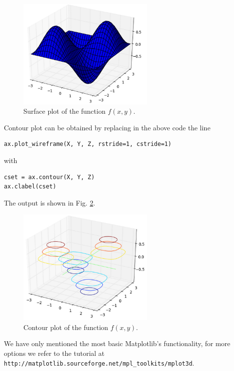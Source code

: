 \documentclass{article}
\begin{document}
\begin{figure}[!ht]
\begin{center}
\includegraphics[width=0.6\textwidth]{img/plot3d-3.png}
\end{center}
\vspace{-4mm}
\caption{Surface plot of the function $f(x, y)$.}
\label{fig:plot3d-3}
\end{figure}
\newpage

\noindent
Contour plot can be obtained by replacing in the above code 
the line 

\begin{verbatim}
ax.plot_wireframe(X, Y, Z, rstride=1, cstride=1)
\end{verbatim}
with 

\begin{verbatim}
cset = ax.contour(X, Y, Z)
ax.clabel(cset)
\end{verbatim}
The output is shown in Fig. \ref{fig:plot3d-4}.
\newpage

\begin{figure}[!ht]
\begin{center}
\includegraphics[width=0.6\textwidth]{img/plot3d-4.png}
\end{center}
\vspace{-4mm}
\caption{Contour plot of the function $f(x, y)$.}
\label{fig:plot3d-4}
\end{figure}
\noindent
We have only mentioned the most basic Matplotlib's functionality, for more options 
we refer to the tutorial 
at {\tt http://matplotlib.sourceforge.net/mpl\_toolkits/mplot3d}.
\end{document}
